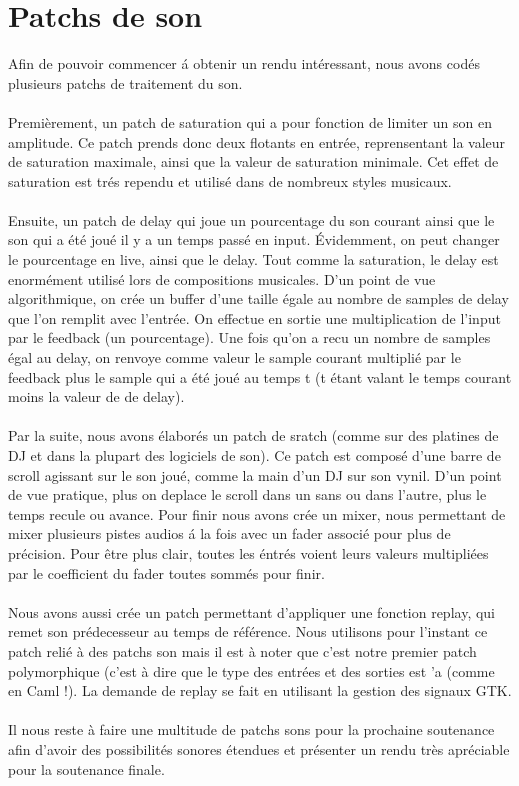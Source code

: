 \section{Patchs de son}
Afin de pouvoir commencer \'a obtenir un rendu int\'eressant, nous avons cod\'es
plusieurs patchs de traitement du son.
\\
\\
Premi\`erement, un patch de saturation qui a pour fonction de limiter un son
en amplitude. Ce patch prends donc deux flotants en entr\'ee, reprensentant la
valeur de saturation maximale, ainsi que la valeur de saturation minimale. Cet
effet de saturation est tr\'es rependu et utilis\'e dans de nombreux styles
musicaux.
\\
\\
Ensuite, un patch de delay qui joue un pourcentage du son
courant ainsi que le son qui a \'et\'e jou\'e il y a un temps pass\'e en input.
\'Evidemment, on peut changer le pourcentage en live, ainsi que le delay. Tout
comme la saturation, le delay est enorm\'ement utilis\'e lors de compositions
musicales.
D'un point de vue algorithmique, on cr\'ee un buffer d'une taille \'egale au
nombre de samples de delay que l'on remplit avec l'entr\'ee. On effectue en
sortie une multiplication de l'input par le feedback (un pourcentage).
Une fois qu'on a recu un nombre de samples \'egal au delay, on renvoye comme
valeur le sample courant multipli\'e par le feedback plus le sample qui a
\'et\'e jou\'e au temps t (t \'etant valant le temps courant moins la valeur
de de delay).
\\
\\
Par la suite, nous avons \'elabor\'es un patch de sratch (comme sur des
platines de DJ et dans la plupart des logiciels de son). Ce patch est compos\'e
d'une barre de scroll agissant sur le son jou\'e, comme la main d'un DJ sur
son vynil. D'un point de vue pratique, plus on deplace le scroll dans un sans
ou dans l'autre, plus le temps recule ou avance.
Pour finir nous avons cr\'ee un mixer, nous permettant de mixer plusieurs
pistes audios \'a la fois avec un fader associ\'e pour plus de pr\'ecision.
Pour \^etre plus clair, toutes les \'entr\'es voient leurs valeurs
multipli\'ees par le coefficient du fader toutes somm\'es pour finir.
\\
\\
Nous avons aussi cr\'ee un patch permettant d'appliquer une fonction replay,
qui remet son pr\'edecesseur au temps de r\'ef\'erence. Nous utilisons pour
l'instant ce patch reli\'e \`a des patchs son mais il est \`a noter que c'est
notre premier patch polymorphique (c'est \`a dire que le type des entr\'ees et
des sorties est 'a (comme en Caml !). La demande de replay se fait en
utilisant la gestion des signaux GTK.
\\
\\
Il nous reste \`a faire une multitude de patchs sons pour la prochaine 
soutenance afin d'avoir des possibilit\'es sonores \'etendues et pr\'esenter 
un rendu tr\`es apr\'eciable pour la soutenance finale.